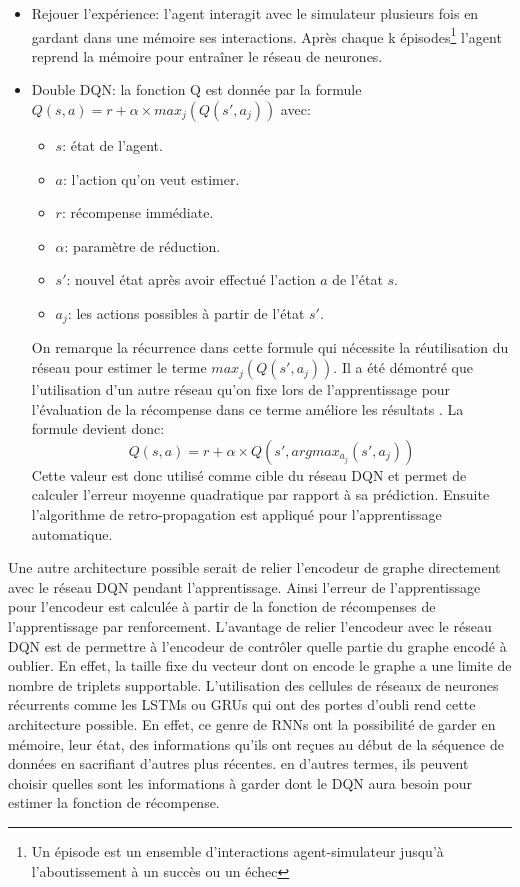 \begin{itemize}
	\item Rejouer l'expérience: l'agent interagit avec le simulateur plusieurs fois en gardant dans une mémoire ses interactions. Après chaque k épisodes\footnote{Un épisode est un ensemble d'interactions agent-simulateur jusqu'à l'aboutissement à un succès ou un échec} l'agent reprend la mémoire pour entraîner le réseau de neurones.
	\item Double DQN: la fonction Q est donnée par la formule $Q(s,a) = r + \alpha \times max_j(Q(s',a_j))$ \cite{Mnih2015} avec:
	\begin{itemize}
		\item $s$: état de l'agent.
		\item $a$: l'action qu'on veut estimer.
		\item $r$: récompense immédiate.
		\item $\alpha$: paramètre de réduction.
		\item $s'$: nouvel état après avoir effectué l'action $a$ de l'état $s$.
		\item $a_j$: les actions possibles à partir de l'état $s'$.
	\end{itemize}
	On remarque la récurrence dans cette formule qui nécessite la réutilisation du réseau pour estimer le terme $max_j (Q(s',a_j))$. Il a été démontré que l'utilisation d'un autre réseau qu'on fixe lors de l'apprentissage pour l'évaluation de la récompense dans ce terme améliore les résultats \cite{Mnih2015}. La formule devient donc: 
	\[Q(s,a) = r + \alpha \times Q(s',argmax_{a_j}(s',a_j))\]
	Cette valeur est donc utilisé comme cible du réseau DQN et permet de calculer l'erreur moyenne quadratique par rapport à sa prédiction. Ensuite l'algorithme de retro-propagation est appliqué pour l'apprentissage automatique.
\end{itemize}
Une autre architecture possible serait de relier l'encodeur de graphe directement avec le réseau DQN pendant l'apprentissage. Ainsi l'erreur de l'apprentissage pour l'encodeur est calculée à partir de la fonction de récompenses de l'apprentissage par renforcement. L'avantage de relier l'encodeur avec le réseau DQN est de permettre à l'encodeur de contrôler quelle partie du graphe encodé à oublier. En effet, la taille fixe du vecteur dont on encode le graphe a une limite de nombre de triplets supportable. L'utilisation des cellules de réseaux de neurones récurrents comme les LSTMs ou GRUs qui ont des portes d'oubli rend cette architecture possible. En effet, ce genre de RNNs ont la possibilité de garder en mémoire, leur état, des informations qu'ils ont reçues au début de la séquence de données en sacrifiant d'autres plus récentes. en d'autres termes, ils peuvent choisir quelles sont les informations à garder dont le DQN aura besoin pour estimer la fonction de récompense.

